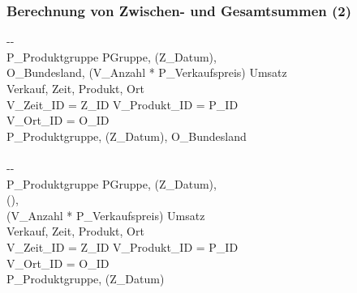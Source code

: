     \begin{frame}[shrink=10]
    \frametitle{Berechnung von Zwischen- und Gesamtsummen (2)}
    
    \begin{sql}
    -{}-  \\
     P\_Produktgruppe   PGruppe, (Z\_Datum), \\
    \1 O\_Bundesland, (V\_Anzahl * P\_Verkaufspreis)  Umsatz \\
      Verkauf, Zeit, Produkt, Ort \\
      V\_Zeit\_ID = Z\_ID  V\_Produkt\_ID = P\_ID  \\
    \1 V\_Ort\_ID = O\_ID \\
     P\_Produktgruppe,  (Z\_Datum), O\_Bundesland \\
       \\
    -{}-  \\
      P\_Produktgruppe  PGruppe,  (Z\_Datum), \\
    \1 (), \\
    \1 (V\_Anzahl * P\_Verkaufspreis)  Umsatz  \\
      Verkauf, Zeit, Produkt, Ort \\
      V\_Zeit\_ID = Z\_ID  V\_Produkt\_ID = P\_ID  \\
    \1 V\_Ort\_ID = O\_ID \\
      P\_Produktgruppe, (Z\_Datum)  \\
        \\
    \end{sql}
    
    \end{frame}
    
